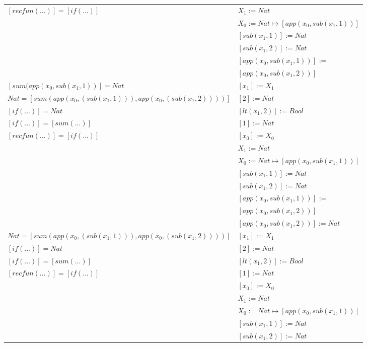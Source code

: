 \begin{exercise}
\begin{description}
\begin{center}
\begin{longtable}{ | l | l | }
                        $[recfun(...)] = [if(...)]$ &  $X_1 := Nat$\\
                        & $X_0 := Nat \mapsto [app(x_0, sub(x_1,1))]$\\ 
                        & $[sub(x_1,1)] := Nat$\\
			     & $[sub(x_1,2)] := Nat$ \\
			     & $[app(x_0, sub(x_1,1))]$ := \\
			     & $[app(x_0, sub(x_1,2))]$\\ 
                    \hline 
                        $[sum(app(x_0, sub(x_1,1))] = Nat$ & $[x_1] := X_1$\\ 
                        $Nat = [sum(app(x_0, (sub(x_1,1))), app(x_0, (sub(x_1,2))))]$ & $[2] := Nat$\\
                        $[if(...)] = Nat$ & $[lt(x_1 , 2)] := Bool$\\ 
                        $[if(...)] = [sum(...)]$ & $[1] := Nat$\\
                        $[recfun(...)] = [if(...)]$ & $[x_0] := X_0$\\
                        &  $X_1 := Nat$\\ 
                        & $X_0 := Nat \mapsto [app(x_0, sub(x_1,1))]$\\
			     & $[sub(x_1,1)] := Nat$\\
			     & $[sub(x_1,2)] := Nat$ \\
			     & $[app(x_0, sub(x_1,1))]$ := \\
			     & $[app(x_0, sub(x_1,2))]$\\ 
			     & $[app(x_0, sub(x_1,2))] := Nat$ \\
                    \hline 
                        $Nat = [sum(app(x_0, (sub(x_1,1))), app(x_0, (sub(x_1,2))))]$ &  $[x_1] := X_1$\\
                        $[if(...)] = Nat$ & $[2] := Nat$\\
                        $[if(...)] = [sum(...)]$ & $[lt(x_1 , 2)] := Bool$\\
                        $[recfun(...)] = [if(...)]$ & $[1] := Nat$\\
                        & $[x_0] := X_0$\\ 
                        &  $X_1 := Nat$\\  
			     & $X_0 := Nat \mapsto [app(x_0, sub(x_1,1))]$\\
			     & $[sub(x_1,1)] := Nat$\\
			     & $[sub(x_1,2)] := Nat$ \\

\end{longtable}
\end{center}
\end{description}
\end{exercise}
